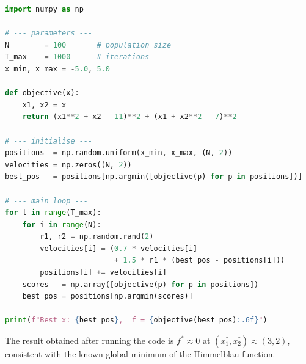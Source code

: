 \begin{lstlisting}[language=Python, caption=Core optimisation loop (Problem 5), label=lst:p5_main]
import numpy as np

# --- parameters ---
N        = 100       # population size
T_max    = 1000      # iterations
x_min, x_max = -5.0, 5.0

def objective(x):
    x1, x2 = x
    return (x1**2 + x2 - 11)**2 + (x1 + x2**2 - 7)**2

# --- initialise ---
positions  = np.random.uniform(x_min, x_max, (N, 2))
velocities = np.zeros((N, 2))
best_pos   = positions[np.argmin([objective(p) for p in positions])]

# --- main loop ---
for t in range(T_max):
    for i in range(N):
        r1, r2 = np.random.rand(2)
        velocities[i] = (0.7 * velocities[i]
                         + 1.5 * r1 * (best_pos - positions[i]))
        positions[i] += velocities[i]
    scores   = np.array([objective(p) for p in positions])
    best_pos = positions[np.argmin(scores)]

print(f"Best x: {best_pos},  f = {objective(best_pos):.6f}")
\end{lstlisting}

The result obtained after running the code is $f^* \approx 0$ at $(x_1^*, x_2^*) \approx (3, 2)$, consistent with the known global minimum of the Himmelblau function.

\clearpage
